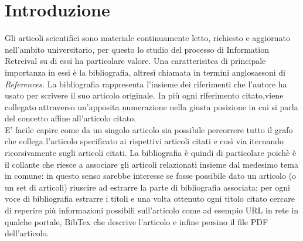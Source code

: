 \section{Introduzione}

Gli articoli scientifici sono materiale continuamente letto, richiesto e aggiornato nell'ambito universitario, per questo lo studio del processo di Information Retreival su di essi ha particolare valore. Una caratterisitca di principale importanza in essi è la bibliografia, altresì chiamata in termini anglosassoni di \textit{References}. La bibliografia rappresenta l'insieme dei riferimenti che l'autore ha usato per scrivere il suo articolo originale. In più ogni riferimento citato,viene collegato attraverso un'apposita numerazione nella giusta posizione in cui si parla del concetto affine all'articolo citato.\\
E' facile capire come da un singolo articolo sia possibile percorrere tutto il grafo che collega l'articolo specificato ai rispettivi articoli citati e così via iternando ricorsivamente sugli articoli citati. La bibliografia è quindi di particolare poichè è il collante che riesce a associare gli articoli relazionati insieme dal medesimo tema in comune: in questo senso sarebbe interesse se fosse possibile dato un articolo (o un set di articoli) riuscire ad estrarre la parte di bibliografia associata; per ogni voce di bibliografia estrarre i titoli e una volta ottenuto ogni titolo citato cercare di reperire più informazioni possibili sull'articolo come ad esempio URL in rete in qualche portale, BibTex che descrive l'articolo e infine persino il file PDF dell'articolo.



